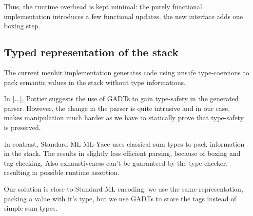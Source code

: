 \documentclass[twoside,a4paper]{article}
\begin{document}
Thus, the runtime overhead is kept minimal: the purely functional
implementation introduces a few functional updates, the new interface adds one
boxing step.



\subsection{Typed representation of the stack}


The current menhir implementation generates code using unsafe type-coercions to
pack semantic values in the stack without type informations.

In [...], Pottier suggests the use of GADTs to gain type-safety in the
generated parser. However, the change in the parser is quite intrusive and in
our case, makes manipulation much harder as we have to statically prove that
type-safety is preserved.

In contrast, Standard ML ML-Yacc uses classical sum types to pack information
in the stack.  The results in slightly less efficient parsing, because of
boxing and tag checking.  Also exhaustiveness can't be guaranteed by the type
checker, resulting in possible runtime assertion.


Our solution is close to Standard ML encoding: we use the same representation,
packing a value with it's type, but we use GADTs to store the tags instead of
simple sum types.
\end{document}
